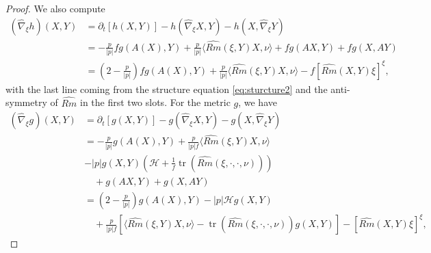 \documentclass{amsart}
\theoremstyle{definition}
\theoremstyle{remark}
\numberwithin{equation}{section}
\begin{document}
\begin{proof}
We also compute
\[
\begin{split}
(\hat{\nabla}_{\xi} h) (X, Y) &= \partial_t[h(X, Y)] - h(\hat{\nabla}_\xi X, Y) - h(X, \hat{\nabla}_\xi Y) \\
&= -\frac{p}{|p|} f  g(A(X),Y)+\frac{p}{|p|}\langle \widehat{Rm}(\xi,Y)X,\nu\rangle + fg(AX, Y) + fg(X, AY) \\
&= \left(2-\frac{p}{|p|}\right) f  g(A(X),Y) + \frac{p}{|p|}\langle \widehat{Rm}(\xi,Y)X,\nu\rangle - f \left[\widehat{Rm}(X, Y)\xi\right]^{\xi},
\end{split}
\]
with the last line coming from the structure equation \eqref{eq:sturcture2} and the anti-symmetry of $\widehat{Rm}$ in the first two slots. For the metric $g$, we have
\[
\begin{split}
(\hat{\nabla}_{\xi} g) (X, Y) &= \partial_t[g(X, Y)] - g(\hat{\nabla}_\xi X, Y) - g(X, \hat{\nabla}_\xi Y) \\
&= -\frac{p}{|p|}g(A(X),Y)+\frac{p}{|p|f}\langle \widehat{Rm}(\xi,Y)X,\nu\rangle \\
&-
|p|g(X,Y)(\mathcal{H}+\frac{1}{f}\operatorname{tr} (\widehat{Rm}(\xi,\cdot,\cdot,\nu))) \\
&\quad + g(AX, Y) + g(X, AY) \\
&= \left(2 -\frac{p}{|p|}\right) g(A(X),Y) -
|p|\mathcal{H} g(X,Y) \\
&\quad + \frac{p}{|p|f} \left[\langle \widehat{Rm}(\xi,Y)X,\nu\rangle -
\operatorname{tr} (\widehat{Rm}(\xi,\cdot,\cdot,\nu))g(X,Y)\right] - \left[\widehat{Rm}(X, Y)\xi\right]^{\xi},
\end{split}
\]


\end{proof}
\end{document}
